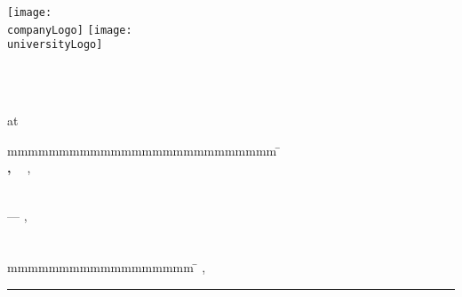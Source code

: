 \begin{titlepage}
	\texttt{[image: \\companyLogo]}
	\hfill
	\texttt{[image: \\universityLogo]}
	\centering
	
	{\large \ \par}
	{\scshape\LARGE \reportType \par}	
	\vspace{1.5cm}
	{\huge\bfseries \thesisTitle \par}
	\vspace{1.5cm}
	{\large \courseOfStudies \\ at \university \par}
	\vspace{1cm}
	{\large \byTitle \par}
	{\Large\itshape \authorName \par}
	\vfill
	{\large \thesisDate \par}
	\vfill
	\begin{tabbing}
		mmmmmmmmmmmmmmmmmmmmmmmmmm			\= \kill 			%
		\textbf{\timeOfProjectTitle}			\> \timeOfProject \\
		\textbf{\studentIdTitle, \ \courseTitle}	\> \studentId, \ \course\\
		\textbf{\companyTitle}				\> \company \\
		\textbf{\supervisorTitle}			\> \supervisorName
	\end{tabbing}
\end{titlepage}

\begin{titlepage}
	\noindent
	\begin{minipage}[c][\textheight][c]{\textwidth}
		\centering	
		\textbf{\textit{\quoteText}} \linebreak
		--- \textsc{\quoteAuthor}, \ \textit{\quoteSource}
	\end{minipage}
\end{titlepage}

\chapter*{\declarationTitle}
\declaration
\vspace{4em}

\begin{tabbing}
	mmmmmmmmmmmmmmmmmm	\= \kill 	%
	\city, \ \signatureDate 	\> \rule{6cm}{0.4pt} \\
				\> \authorName
\end{tabbing}

\begin{otherlanguage}{ngerman} 
\begin{abstract}
	\abstractGermanText
\end{abstract}
\end{otherlanguage}

\begin{abstract}
	\abstractText
\end{abstract}
